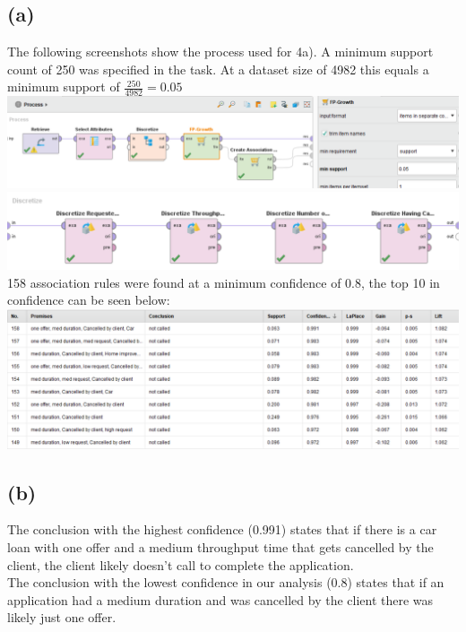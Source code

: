 \documentclass[../../main.tex]{subfiles}
\begin{document}
\subsection*{(a)}
The following screenshots show the process used for 4a). A minimum support count of 250 was specified in the task. At a dataset size of 4982 this equals a minimum support of $\frac{250}{4982}=0.05$\\
\includegraphics[width=\textwidth]{img/QUESTION_4a_PROCESS_overview.png}
\includegraphics[width=\textwidth]{img/QUESTION_4a_PROCESS_discretize.png}
158 association rules were found at a minimum confidence of 0.8, the top 10 in confidence can be seen below:\\
\includegraphics[width=\textwidth]{img/QUESTION_4a_association_rules.png}

\subsection*{(b)}
The conclusion with the highest confidence (0.991) states that if there is a car loan with one offer and a medium throughput time that gets cancelled by the client, the client likely doesn't call to complete the application.\\
The conclusion with the lowest confidence in our analysis (0.8) states that if an application had a medium duration and was cancelled by the client there was likely just one offer.
\end{document}
